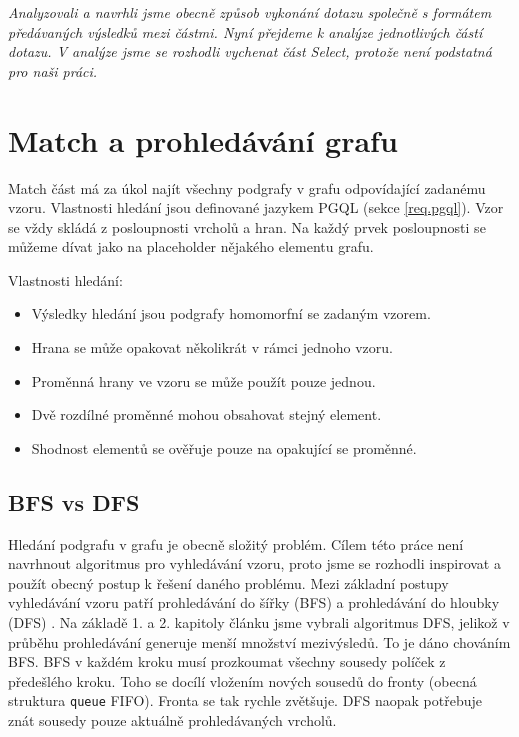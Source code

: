 \bigskip
\textit{Analyzovali a navrhli jsme obecně způsob vykonání dotazu společně s formátem předávaných výsledků mezi částmi. 
Nyní přejdeme k analýze jednotlivých částí dotazu. 
V analýze jsme se rozhodli vychenat část Select, protože není podstatná pro naši práci.}

\section{Match a prohledávání grafu} \label{anal.match}

Match část má za úkol najít všechny podgrafy v grafu odpovídající zadanému vzoru.
Vlastnosti hledání jsou definované jazykem PGQL (sekce \ref{req.pgql}).
Vzor se vždy skládá z posloupnosti vrcholů a hran.
Na každý prvek posloupnosti se můžeme dívat jako na placeholder nějakého elementu grafu.

Vlastnosti hledání:
\begin{itemize}

\item Výsledky hledání jsou podgrafy homomorfní se zadaným vzorem.
\item Hrana se může opakovat několikrát v rámci jednoho vzoru.
\item Proměnná hrany ve vzoru se může použít pouze jednou.
\item Dvě rozdílné proměnné mohou obsahovat stejný element.
\item Shodnost elementů se ověřuje pouze na opakující se proměnné.

\end{itemize}

\subsection{BFS vs DFS}

Hledání podgrafu v grafu je obecně složitý problém. 
Cílem této práce není navrhnout algoritmus pro vyhledávání vzoru, proto jsme se rozhodli inspirovat a použít obecný postup k řešení daného problému.
Mezi základní postupy vyhledávání vzoru patří prohledávání do šířky (BFS) a prohledávání do hloubky (DFS) \citep[kap. 4]{graphAlg}. 
Na základě 1. a 2. kapitoly článku \citet{asyncPGX} jsme vybrali algoritmus DFS, jelikož v průběhu prohledávání generuje menší množství mezivýsledů.
To je dáno chováním BFS. 
BFS v každém kroku musí prozkoumat všechny sousedy políček z předešlého kroku.
Toho se docílí vložením nových sousedů do fronty (obecná struktura \texttt{queue} FIFO).
Fronta se tak rychle zvětšuje.
DFS naopak potřebuje znát sousedy pouze aktuálně prohledávaných vrcholů.


